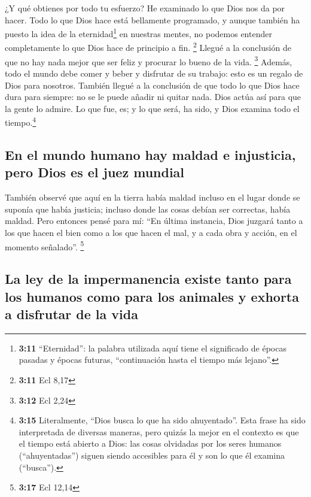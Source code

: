  ¿Y qué obtienes por todo tu esfuerzo?  He
examinado lo que Dios nos da por hacer.  Todo lo que Dios
hace está bellamente programado, y aunque también ha puesto la idea de
la eternidad\footnote{\textbf{3:11} ``Eternidad'': la palabra utilizada
  aquí tiene el significado de épocas pasadas y épocas futuras,
  ``continuación hasta el tiempo más lejano''.} en nuestras mentes, no
podemos entender completamente lo que Dios hace de principio a fin.
\footnote{\textbf{3:11} Ecl 8,17}  Llegué a la conclusión
de que no hay nada mejor que ser feliz y procurar lo bueno de la vida.
\footnote{\textbf{3:12} Ecl 2,24}  Además, todo el mundo
debe comer y beber y disfrutar de su trabajo: esto es un regalo de Dios
para nosotros.  También llegué a la conclusión de que
todo lo que Dios hace dura para siempre: no se le puede añadir ni quitar
nada. Dios actúa así para que la gente lo admire.  Lo que
fue, es; y lo que será, ha sido, y Dios examina todo el
tiempo.\footnote{\textbf{3:15} Literalmente, ``Dios busca lo que ha sido
  ahuyentado''. Esta frase ha sido interpretada de diversas maneras,
  pero quizás la mejor en el contexto es que el tiempo está abierto a
  Dios: las cosas olvidadas por los seres humanos (``ahuyentadas'')
  siguen siendo accesibles para él y son lo que él examina (``busca'').}

\hypertarget{en-el-mundo-humano-hay-maldad-e-injusticia-pero-dios-es-el-juez-mundial}{%
\subsection{En el mundo humano hay maldad e injusticia, pero Dios es el
juez
mundial}\label{en-el-mundo-humano-hay-maldad-e-injusticia-pero-dios-es-el-juez-mundial}}

 También observé que aquí en la tierra había maldad
incluso en el lugar donde se suponía que había justicia; incluso donde
las cosas debían ser correctas, había maldad.  Pero
entonces pensé para mí: ``En última instancia, Dios juzgará tanto a los
que hacen el bien como a los que hacen el mal, y a cada obra y acción,
en el momento señalado''. \footnote{\textbf{3:17} Ecl 12,14}

\hypertarget{la-ley-de-la-impermanencia-existe-tanto-para-los-humanos-como-para-los-animales-y-exhorta-a-disfrutar-de-la-vida}{%
\subsection{La ley de la impermanencia existe tanto para los humanos
como para los animales y exhorta a disfrutar de la
vida}\label{la-ley-de-la-impermanencia-existe-tanto-para-los-humanos-como-para-los-animales-y-exhorta-a-disfrutar-de-la-vida}}

